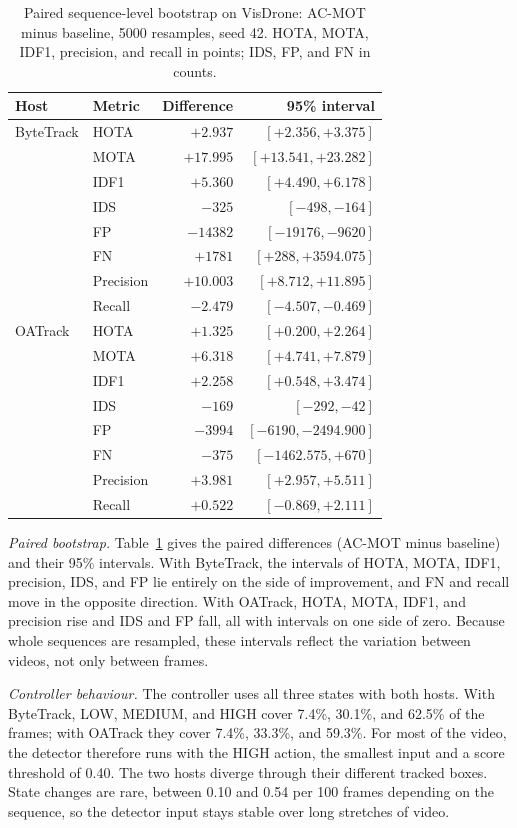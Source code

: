 \documentclass[pdflatex,sn-mathphys-num,iicol]{sn-jnl}
\begin{document}
\begin{table}[t]
\caption{Paired sequence-level bootstrap on VisDrone: AC-MOT minus baseline,
5000 resamples, seed 42. HOTA, MOTA, IDF1, precision, and recall in points;
IDS, FP, and FN in counts.}
\label{tab:bootstrap}
\centering\footnotesize
\setlength{\tabcolsep}{4pt}
\begin{tabular}{@{}llrr@{}}
\toprule
Host & Metric & Difference & 95\% interval\\
\midrule
ByteTrack & HOTA & $+2.937$ & $[+2.356, +3.375]$\\
 & MOTA & $+17.995$ & $[+13.541, +23.282]$\\
 & IDF1 & $+5.360$ & $[+4.490, +6.178]$\\
 & IDS & $-325$ & $[-498, -164]$\\
 & FP & $-14382$ & $[-19176, -9620]$\\
 & FN & $+1781$ & $[+288, +3594.075]$\\
 & Precision & $+10.003$ & $[+8.712, +11.895]$\\
 & Recall & $-2.479$ & $[-4.507, -0.469]$\\
\midrule
OATrack & HOTA & $+1.325$ & $[+0.200, +2.264]$\\
 & MOTA & $+6.318$ & $[+4.741, +7.879]$\\
 & IDF1 & $+2.258$ & $[+0.548, +3.474]$\\
 & IDS & $-169$ & $[-292, -42]$\\
 & FP & $-3994$ & $[-6190, -2494.900]$\\
 & FN & $-375$ & $[-1462.575, +670]$\\
 & Precision & $+3.981$ & $[+2.957, +5.511]$\\
 & Recall & $+0.522$ & $[-0.869, +2.111]$\\
\bottomrule
\end{tabular}
\end{table}

\emph{Paired bootstrap.} Table~\ref{tab:bootstrap} gives the paired differences (AC-MOT minus baseline)
and their 95\% intervals. With ByteTrack, the intervals of HOTA, MOTA, IDF1,
precision, IDS, and FP lie entirely on the side of improvement, and FN and
recall move in the opposite direction. With OATrack, HOTA, MOTA, IDF1, and
precision rise and IDS and FP fall, all with intervals on one side of zero.
Because whole sequences are resampled, these intervals reflect the variation
between videos, not only between frames.

\emph{Controller behaviour.} The controller uses all three states with both hosts. With ByteTrack, LOW,
MEDIUM, and HIGH cover 7.4\%, 30.1\%, and 62.5\% of the frames; with OATrack
they cover 7.4\%, 33.3\%, and 59.3\%. For most of the video, the detector
therefore runs with the HIGH action, the smallest input and a score threshold
of 0.40. The two hosts diverge through their different tracked boxes. State changes are rare, between 0.10 and 0.54 per 100
frames depending on the sequence, so the detector input stays stable over
long stretches of video.
\end{document}
